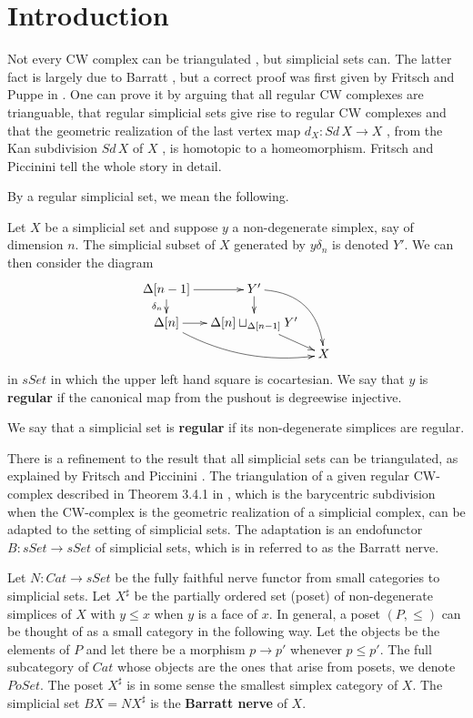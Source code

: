 \section{Introduction}
\label{sec:intro}

Not every CW complex can be triangulated \cite{Me67}, but simplicial sets can. The latter fact is largely due to Barratt \cite{Ba56}, but a correct proof was first given by Fritsch and Puppe in \cite{FP67}. One can prove it by arguing that all regular CW complexes are trianguable, that regular simplicial sets give rise to regular CW complexes and that the geometric realization of the last vertex map $d_X:Sd\, X\to X$ \cite[§7]{Ka57}, from the Kan subdivision $Sd\, X$ of $X$ \cite[§7]{Ka57}, is homotopic to a homeomorphism. Fritsch and Piccinini \cite[pp.~208--209]{FP90} tell the whole story in detail.

By a regular simplicial set, we mean the following.
\begin{definition}
Let $X$ be a simplicial set and suppose $y$ a non-degenerate simplex, say of dimension $n$. The simplicial subset of $X$ generated by $y\delta _n$ is denoted $Y'$. We can then consider the diagram
\begin{displaymath}
\xymatrix@=1em{
\Delta [n-1] \ar[d]_{\delta _n} \ar[r] & Y' \ar[d] \ar@/^1.5pc/[ddr] \\
\Delta [n] \ar@/_1pc/[drr] \ar[r] & \Delta [n]\sqcup _{\Delta [n-1]}Y' \ar[dr] \\
&& X
}
\end{displaymath}
in $sSet$ in which the upper left hand square is cocartesian. We say that $y$ is \textbf{regular} \cite[p.~208]{FP90} if the canonical map from the pushout is degreewise injective.
\end{definition}
\noindent We say that a simplicial set is \textbf{regular} if its non-degenerate simplices are regular.

There is a refinement to the result that all simplicial sets can be triangulated, as explained by Fritsch and Piccinini \cite[Ex.~5--8,~pp.~219--220]{FP90}. The triangulation of a given regular CW-complex described in Theorem 3.4.1 in \cite{FP90}, which is the barycentric subdivision when the CW-complex is the geometric realization of a simplicial complex, can be adapted to the setting of simplicial sets. The adaptation is an endofunctor $B:sSet\to sSet$ of simplicial sets, which is in \cite[p.~35]{WJR13} referred to as the Barratt nerve.

Let $N:Cat\to sSet$ be the fully faithful nerve functor from small categories to simplicial sets. Let $X^\sharp$ be the partially ordered set (poset) of non-degenerate simplices of $X$ with $y\leq x$ when $y$ is a face of $x$. In general, a poset $(P,\leq )$ can be thought of as a small category in the following way. Let the objects be the elements of $P$ and let there be a morphism $p\to p'$ whenever $p\leq p'$. The full subcategory of $Cat$ whose objects are the ones that arise from posets, we denote $PoSet$. The poset $X^\sharp$ is in some sense the smallest simplex category of $X$. The simplicial set $BX=NX^\sharp$ is the \textbf{Barratt nerve} of $X$.


